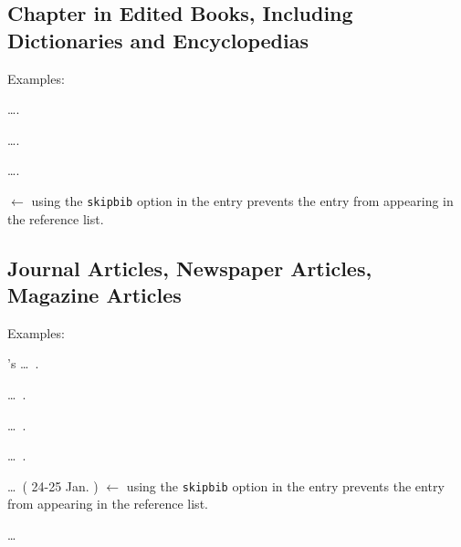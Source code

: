 \documentclass[a4paper, 11pt]{article}
\newcommand*{\subsectionRefSection}[1]{
    \subsection{#1}
    \refsection
}
\newcommand*{\printsubbibliographyEndRefSection}{
    \printbibliography[heading=subbibliography, title=Reference]
    \endrefsection
}
\newenvironment{agpsExample}{
    \setlength{\parindent}{0pt}
    \medskip
}
{}
\newenvironment{bareList}{%
    \begin{list}{}{}%
}
{\end{list}}
\begin{document}
\printsubbibliographyEndRefSection

\subsectionRefSection{Chapter in Edited Books, Including Dictionaries and Encyclopedias}

\begin{agpsExample}

    Examples:

    \begin{bareList}
        \item \ldots \autocite[255]{Brandt2002DefectNewborMorali}.
        \item \ldots \autocite[26]{Gould2000MoreThingsHeaven}.
        \item \ldots \autocite[5]{DaddsEtAl2004DiagnoIssues}.
        \item \Textcite[334]{ConcisOxfordDictio1990} $\leftarrow$ using the \texttt{skipbib} option
        in the entry prevents the entry from appearing in the reference list.
    \end{bareList}

\end{agpsExample}

\printsubbibliographyEndRefSection

\subsectionRefSection{Journal Articles, Newspaper Articles, Magazine Articles}

\begin{agpsExample}

    Examples:

    \begin{bareList}
        \item {}'s \citeyear{Wong2009RethinHobbitIndone}
        \ldots\ .
        \item \ldots\ \autocite[23-5]{Griffith1995CoordiFamilySchool}.
        \item \ldots\ \autocite[23-5]{McCarthyEtAl2021DroneThermaRemote}.
        \item \ldots\ \autocite[16-17]{JeffersEtAl2010RealitDrough}.
        \item \ldots\ ( 24-25 Jan. \citeyear[19]{WeekenAustra1987})
        $\leftarrow$ using the \texttt{skipbib} option in the entry prevents the entry from
        appearing in the reference list.
        \item \Textcite{ClearyEtAl2001ItsEndLong} \ldots
    \end{bareList}

\end{agpsExample}
\end{document}
